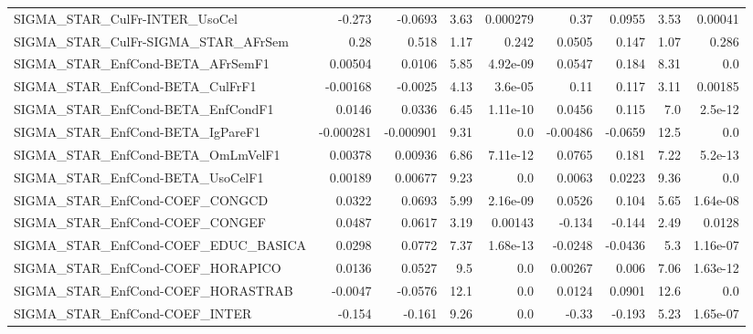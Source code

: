 \begin{tabular}{lrrrrrrrr}
SIGMA\_STAR\_CulFr-INTER\_UsoCel         &      -0.273 &      -0.0693 &     3.63 & 0.000279 &       0.37 &      0.0955 &         3.53 &       0.00041 \\
SIGMA\_STAR\_CulFr-SIGMA\_STAR\_AFrSem    &        0.28 &        0.518 &     1.17 &    0.242 &     0.0505 &       0.147 &         1.07 &         0.286 \\
SIGMA\_STAR\_EnfCond-BETA\_AFrSemF1      &     0.00504 &       0.0106 &     5.85 & 4.92e-09 &     0.0547 &       0.184 &         8.31 &           0.0 \\
SIGMA\_STAR\_EnfCond-BETA\_CulFrF1       &    -0.00168 &      -0.0025 &     4.13 &  3.6e-05 &       0.11 &       0.117 &         3.11 &       0.00185 \\
SIGMA\_STAR\_EnfCond-BETA\_EnfCondF1     &      0.0146 &       0.0336 &     6.45 & 1.11e-10 &     0.0456 &       0.115 &          7.0 &       2.5e-12 \\
SIGMA\_STAR\_EnfCond-BETA\_IgPareF1      &   -0.000281 &    -0.000901 &     9.31 &      0.0 &   -0.00486 &     -0.0659 &         12.5 &           0.0 \\
SIGMA\_STAR\_EnfCond-BETA\_OmLmVelF1     &     0.00378 &      0.00936 &     6.86 & 7.11e-12 &     0.0765 &       0.181 &         7.22 &       5.2e-13 \\
SIGMA\_STAR\_EnfCond-BETA\_UsoCelF1      &     0.00189 &      0.00677 &     9.23 &      0.0 &     0.0063 &      0.0223 &         9.36 &           0.0 \\
SIGMA\_STAR\_EnfCond-COEF\_CONGCD        &      0.0322 &       0.0693 &     5.99 & 2.16e-09 &     0.0526 &       0.104 &         5.65 &      1.64e-08 \\
SIGMA\_STAR\_EnfCond-COEF\_CONGEF        &      0.0487 &       0.0617 &     3.19 &  0.00143 &     -0.134 &      -0.144 &         2.49 &        0.0128 \\
SIGMA\_STAR\_EnfCond-COEF\_EDUC\_BASICA   &      0.0298 &       0.0772 &     7.37 & 1.68e-13 &    -0.0248 &     -0.0436 &          5.3 &      1.16e-07 \\
SIGMA\_STAR\_EnfCond-COEF\_HORAPICO      &      0.0136 &       0.0527 &      9.5 &      0.0 &    0.00267 &       0.006 &         7.06 &      1.63e-12 \\
SIGMA\_STAR\_EnfCond-COEF\_HORASTRAB     &     -0.0047 &      -0.0576 &     12.1 &      0.0 &     0.0124 &      0.0901 &         12.6 &           0.0 \\
SIGMA\_STAR\_EnfCond-COEF\_INTER         &      -0.154 &       -0.161 &     9.26 &      0.0 &      -0.33 &      -0.193 &         5.23 &      1.65e-07 \\

\end{tabular}
